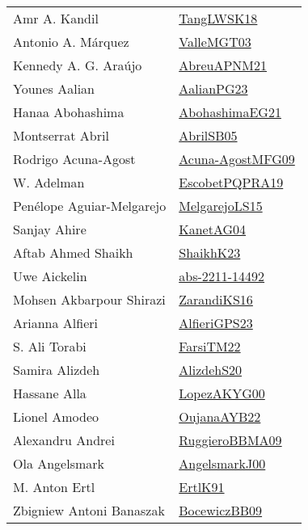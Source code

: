 {\begin{longtable}{p{4cm}p{20cm}}
Amr A. Kandil & \href{}{TangLWSK18}\cite{TangLWSK18} \\
Antonio A. M{\'{a}}rquez & \href{papers/ValleMGT03.pdf}{ValleMGT03}\cite{ValleMGT03} \\
Kennedy A. G. Ara{\'u}jo & \href{}{AbreuAPNM21}\cite{AbreuAPNM21} \\
Younes Aalian & \href{papers/AalianPG23.pdf}{AalianPG23}\cite{AalianPG23} \\
Hanaa Abohashima & \href{articles/AbohashimaEG21.pdf}{AbohashimaEG21}\cite{AbohashimaEG21} \\
Montserrat Abril & \href{papers/AbrilSB05.pdf}{AbrilSB05}\cite{AbrilSB05} \\
Rodrigo Acuna{-}Agost & \href{papers/Acuna-AgostMFG09.pdf}{Acuna-AgostMFG09}\cite{Acuna-AgostMFG09} \\
W. Adelman & \href{articles/EscobetPQPRA19.pdf}{EscobetPQPRA19}\cite{EscobetPQPRA19} \\
Pen{\'{e}}lope Aguiar{-}Melgarejo & \href{papers/MelgarejoLS15.pdf}{MelgarejoLS15}\cite{MelgarejoLS15} \\
Sanjay Ahire & \href{}{KanetAG04}\cite{KanetAG04} \\
Aftab Ahmed Shaikh & \href{}{ShaikhK23}\cite{ShaikhK23} \\
Uwe Aickelin & \href{articles/abs-2211-14492.pdf}{abs-2211-14492}\cite{abs-2211-14492} \\
Mohsen Akbarpour Shirazi & \href{articles/ZarandiKS16.pdf}{ZarandiKS16}\cite{ZarandiKS16} \\
Arianna Alfieri & \href{articles/AlfieriGPS23.pdf}{AlfieriGPS23}\cite{AlfieriGPS23} \\
S. Ali Torabi & \href{}{FarsiTM22}\cite{FarsiTM22} \\
Samira Alizdeh & \href{}{AlizdehS20}\cite{AlizdehS20} \\
Hassane Alla & \href{articles/LopezAKYG00.pdf}{LopezAKYG00}\cite{LopezAKYG00} \\
Lionel Amodeo & \href{papers/OujanaAYB22.pdf}{OujanaAYB22}\cite{OujanaAYB22} \\
Alexandru Andrei & \href{articles/RuggieroBBMA09.pdf}{RuggieroBBMA09}\cite{RuggieroBBMA09} \\
Ola Angelsmark & \href{papers/AngelsmarkJ00.pdf}{AngelsmarkJ00}\cite{AngelsmarkJ00} \\
M. Anton Ertl & \href{papers/ErtlK91.pdf}{ErtlK91}\cite{ErtlK91} \\
Zbigniew Antoni Banaszak & \href{}{BocewiczBB09}\cite{BocewiczBB09} \\

\end{longtable}}

